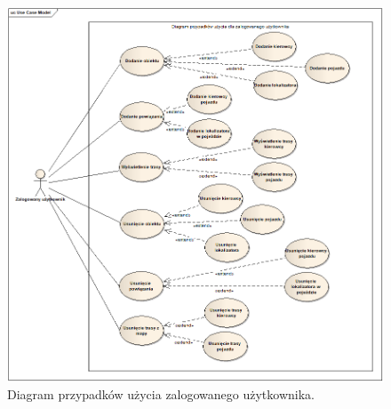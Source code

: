 \begin{figure}
\centering
\includegraphics[width=1\textwidth]{./graf/Przypadki_uzycia_zalogowany.png}
\caption{Diagram przypadków użycia zalogowanego użytkownika.}
\label{fig:3.2}
\end{figure}

